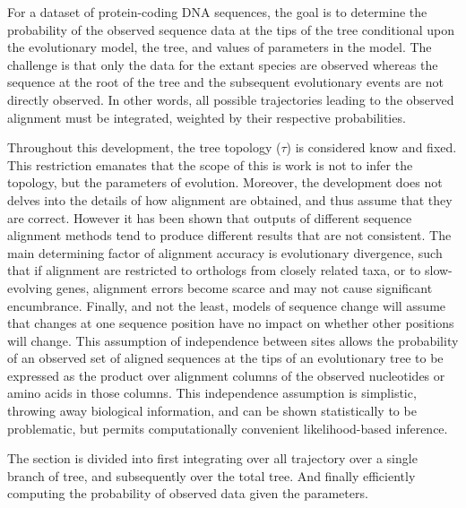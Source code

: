 For a dataset of protein-coding \acrshort{DNA} sequences, the goal is to determine the probability of the observed sequence data at the tips of the tree conditional upon the evolutionary model, the tree, and values of parameters in the model.
The challenge is that only the data for the extant species are observed whereas the sequence at the root of the tree and the subsequent evolutionary events are not directly observed.
In other words, all possible trajectories leading to the observed alignment must be integrated, weighted by their respective probabilities.

Throughout this development, the tree topology ($\tau$) is considered know and fixed.
This restriction emanates that the scope of this is work is not to infer the topology, but the parameters of evolution.
Moreover, the development does not delves into the details of how alignment are obtained, and thus assume that they are correct.
However it has been shown that outputs of different sequence alignment methods tend to produce different results that are not consistent.
The main determining factor of alignment accuracy is evolutionary divergence, such that if alignment are restricted to orthologs from closely related taxa, or to slow-evolving genes, alignment errors become scarce and may not cause significant encumbrance.
Finally, and not the least, models of sequence change will assume that changes at one sequence position have no impact on whether other positions will change.
This assumption of independence between sites allows the probability of an observed set of aligned sequences at the tips of an evolutionary tree to be expressed as the product over alignment columns of the observed nucleotides or amino acids in those columns. 
This independence assumption is simplistic, throwing away biological information, and can be shown statistically to be problematic, but permits computationally convenient likelihood-based inference.

The section is divided into first integrating over all trajectory over a single branch of tree, and subsequently over the total tree. And finally efficiently computing the probability of observed data given the parameters.

